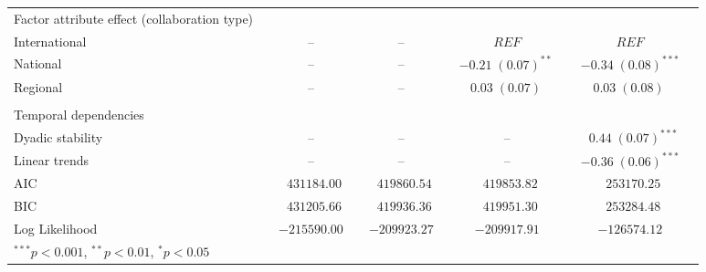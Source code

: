 \begin{table}
\begin{center}
\begin{tabular}{@{}lcclclclcl@{}}
Factor attribute effect (collaboration type) & & & & & & & & \\
\hspace{10pt}International & & -- & & -- & & $REF$ & & $REF$ \\
\hspace{10pt}National  &  &  --   &  &   --   &  & $-0.21 \; (0.07)^{**~}$ &  & $-0.34 \; (0.08)^{***}$ \\
\hspace{10pt}Regional &  &    --  &  &   --   &  & $\hspace{6pt}0.03 \; (0.07)^{~~~~}$ &  & $\hspace{6pt}0.03 \; (0.08)^{~~~~}$    \\\\
Temporal dependencies & & & & & & & & \\
\hspace{10pt}Dyadic stability  &  &  --  &  &  -- &  &   --  &  & $\hspace{6pt}0.44 \; (0.07)^{***}$  \\
\hspace{10pt}Linear trends     &  &  --  &  &  -- &  &   --  &  & $-0.36 \; (0.06)^{***}$ \\
\midrule
AIC    & & $\hspace{6pt}431184.00$   & & $\hspace{6pt}419860.54$ & & $\hspace{6pt}419853.82$ & & $\hspace{6pt}253170.25$   \\
BIC    & & $\hspace{6pt}431205.66$ & & $\hspace{6pt}419936.36$ & & $\hspace{6pt}419951.30$ & & $\hspace{6pt}253284.48$    \\
Log Likelihood    & & $-215590.00$ & & $-209923.27$ & & $-209917.91$ & & $-126574.12$ \\
\bottomrule
\multicolumn{5}{l}{\scriptsize{$^{***}p<0.001$, $^{**}p<0.01$, $^*p<0.05$}}
\end{tabular}
\end{center}
\end{table}

